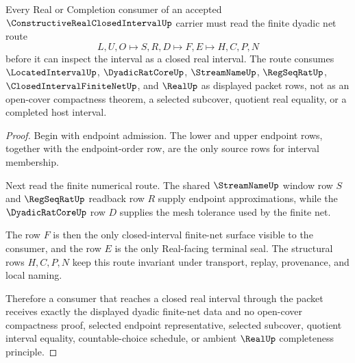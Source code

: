 \begin{theorem}
\label{thm:constructive-real-closed-interval-dyadic-net}
Every Real or Completion consumer of an accepted $\ConstructiveRealClosedIntervalUp$ carrier must read the finite dyadic net route
$$
L,U,O \longmapsto S,R,D \longmapsto F,E \longmapsto H,C,P,N
$$
before it can inspect the interval as a closed real interval. The route consumes $\LocatedIntervalUp$, $\DyadicRatCoreUp$, $\StreamNameUp$, $\RegSeqRatUp$, $\ClosedIntervalFiniteNetUp$, and $\RealUp$ as displayed packet rows, not as an open-cover compactness theorem, a selected subcover, quotient real equality, or a completed host interval.
\end{theorem}
\begin{proof}
Begin with endpoint admission. The lower and upper endpoint rows, together with the endpoint-order row, are the only source rows for interval membership.

Next read the finite numerical route. The shared $\StreamNameUp$ window row $S$ and $\RegSeqRatUp$ readback row $R$ supply endpoint approximations, while the $\DyadicRatCoreUp$ row $D$ supplies the mesh tolerance used by the finite net.

The row $F$ is then the only closed-interval finite-net surface visible to the consumer, and the row $E$ is the only Real-facing terminal seal. The structural rows $H,C,P,N$ keep this route invariant under transport, replay, provenance, and local naming.

Therefore a consumer that reaches a closed real interval through the packet receives exactly the displayed dyadic finite-net data and no open-cover compactness proof, selected endpoint representative, selected subcover, quotient interval equality, countable-choice schedule, or ambient $\RealUp$ completeness principle.
\end{proof}



